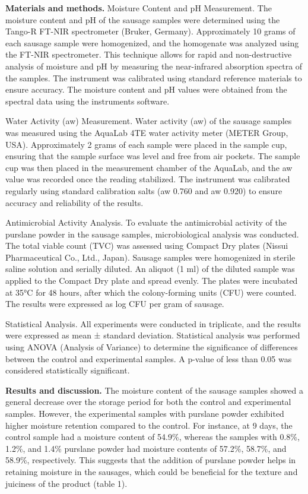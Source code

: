 {\bfseries Materials and methods.} Moisture Content and pH Measurement. The
moisture content and pH of the sausage samples were determined using the
Tango-R FT-NIR spectrometer (Bruker, Germany). Approximately 10 grams of
each sausage sample were homogenized, and the homogenate was analyzed
using the FT-NIR spectrometer. This technique allows for rapid and
non-destructive analysis of moisture and pH by measuring the
near-infrared absorption spectra of the samples. The instrument was
calibrated using standard reference materials to ensure accuracy. The
moisture content and pH values were obtained from the spectral data
using the instrument\textquotesingle s software.

Water Activity (aw) Measurement. Water activity (aw) of the sausage
samples was measured using the AquaLab 4TE water activity meter (METER
Group, USA). Approximately 2 grams of each sample were placed in the
sample cup, ensuring that the sample surface was level and free from air
pockets. The sample cup was then placed in the measurement chamber of
the AquaLab, and the aw value was recorded once the reading stabilized.
The instrument was calibrated regularly using standard calibration salts
(aw 0.760 and aw 0.920) to ensure accuracy and reliability of the
results.

Antimicrobial Activity Analysis. To evaluate the antimicrobial activity
of the purslane powder in the sausage samples, microbiological analysis
was conducted. The total viable count (TVC) was assessed using Compact
Dry plates (Nissui Pharmaceutical Co., Ltd., Japan). Sausage samples
were homogenized in sterile saline solution and serially diluted. An
aliquot (1 ml) of the diluted sample was applied to the Compact Dry
plate and spread evenly. The plates were incubated at 35°C for 48 hours,
after which the colony-forming units (CFU) were counted. The results
were expressed as log CFU per gram of sausage.

Statistical Analysis. All experiments were conducted in triplicate, and
the results were expressed as mean ± standard deviation. Statistical
analysis was performed using ANOVA (Analysis of Variance) to determine
the significance of differences between the control and experimental
samples. A p-value of less than 0.05 was considered statistically
significant.

{\bfseries Results and discussion.} The moisture content of the sausage
samples showed a general decrease over the storage period for both the
control and experimental samples. However, the experimental samples with
purslane powder exhibited higher moisture retention compared to the
control. For instance, at 9 days, the control sample had a moisture
content of 54.9\%, whereas the samples with 0.8\%, 1.2\%, and 1.4\%
purslane powder had moisture contents of 57.2\%, 58.7\%, and 58.9\%,
respectively. This suggests that the addition of purslane powder helps
in retaining moisture in the sausages, which could be beneficial for the
texture and juiciness of the product (table 1).

